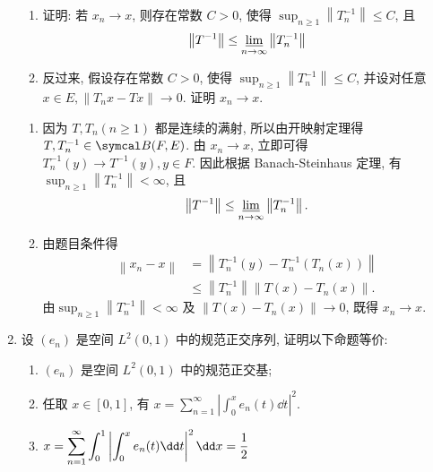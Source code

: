 \begin{enumerate}
\begin{enumerate}
            \item 证明: 若 $x_{n} \rightarrow x$, 则存在常数 $C>0$, 使得 $\sup _{n \geq 1}\left\|T_{n}^{-1}\right\| \leq C$, 且
            \[
            \left\|T^{-1}\right\| \leq \varliminf_{n \rightarrow \infty}\left\|T_{n}^{-1}\right\|
            \]
            \item 反过来, 假设存在常数 $C>0$, 使得 $\sup _{n \geq 1}\left\|T_{n}^{-1}\right\| \leq C$, 并设对任意 $x\in E,\left\|T_{n} x-T x\right\| \rightarrow 0 .$ 证明 $x_{n} \rightarrow x .$
        \end{enumerate}
        \begin{answer}
            \begin{enumerate}
                \item 因为 $T, T_{n}(n \geq 1)$ 都是连续的满射, 所以由开映射定理得$T,T_n^{-1}\in \cB(F,E)$. 由 $x_{n} \rightarrow x$, 立即可得 $T_{n}^{-1}(y) \rightarrow T^{-1}(y), y \in F$. 因此根据 Banach-Steinhaus 定理, 有 $\sup _{n \geq 1}\left\|T_{n}^{-1}\right\|<\infty$, 且
                \[
                    \left\|T^{-1}\right\| \leq \varliminf_{n \rightarrow \infty}\left\|T_{n}^{-1}\right\|.
                \]
                \item 由题目条件得
                \[
                    \begin{aligned}
                    \left\|x_{n}-x\right\| &=\left\|T_{n}^{-1}(y)-T_{n}^{-1}\left(T_{n}(x)\right)\right\| \\
                    & \leq\left\|T_{n}^{-1}\right\|\left\|T(x)-T_{n}(x)\right\|.
                    \end{aligned}
                \]由$\sup _{n \geq 1}\left\|T_{n}^{-1}\right\|<\infty$ 及 $\left\|T(x)-T_{n}(x)\right\| \rightarrow 0$, 既得 $x_{n} \longrightarrow x$.
            \end{enumerate}
        \end{answer}
    \item 设 $\left(e_{n}\right)$ 是空间 $L^{2}(0,1)$ 中的规范正交序列, 证明以下命题等价:
        \begin{enumerate}
            \item\label{problem:20182019-18-1} $\left(e_{n}\right)$ 是空间 $L^{2}(0,1)$ 中的规范正交基;
            \item\label{problem:20182019-18-2} 任取 $x \in[0,1]$, 有 $x=\displaystyle\sum\limits_{n=1}^{\infty} \left|\displaystyle\int_{0}^{x}e_{n}(t) \dd t\right|^{2}$.
            \item $x=\displaystyle\sum\limits_{n=1}^{\infty} \displaystyle\int_{0}^{1}\left|\displaystyle\int_{0}^{x}e_{n}(t) \dt\right|^{2} \dx=\frac{1}{2}$

\end{enumerate}
\end{enumerate}
